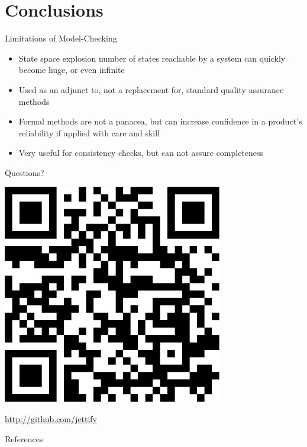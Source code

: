\documentclass[12pt]{beamer}
\begin{document}
  \section{Conclusions}
  \begin{frame}{Limitations of Model-Checking}
    \begin{itemize}
      \item State space explosion number of states reachable by a system
          can quickly become huge, or even infinite
      \item Used as an adjunct to, not a replacement for, standard quality
          assurance methods
      \item Formal methods are not a panacea, but can increase confidence in
          a product’s reliability if applied with care and skill
      \item Very useful for consistency checks, but can not assure completeness
    \end{itemize}
  \end{frame}
\begin{frame}
    \vspace{1cm}
    \begin{center}{\Huge Questions?} \end{center}
    \begin{center} \includegraphics[scale=0.7]{figures/qrcode}\end{center}
    \begin{center}
        \href{http://github.com/jettify}{http://github.com/jettify}
    \end{center}
\end{frame}
\appendix
\begin{frame}[allowframebreaks]{References}
    
    
\end{frame}
\end{document}
